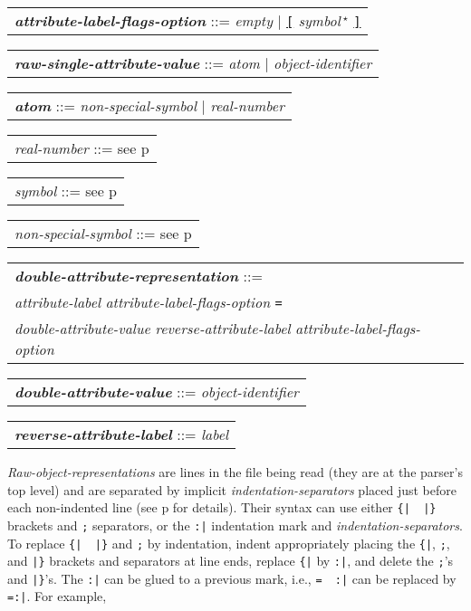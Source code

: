 \documentclass[12pt]{article}
\makeatletter
\newcommand{\emkey}[1]{{\bf \em #1}\index{#1@{\em #1}}}
\newcommand{\pagref}[1]{p\pageref{#1}}
\newenvironment{indpar}[1][0.3in]%
	{\begin{list}{}%
		     {\setlength{\itemsep}{0in}%
		      \setlength{\topsep}{0in}%
		      \setlength{\parsep}{1ex}%
		      \setlength{\labelwidth}{#1}%
		      \setlength{\leftmargin}{#1}%
		      \addtolength{\leftmargin}{\labelsep}}%
	 \item}%
	{\end{list}}
\makeatother
\begin{document}
\begin{indpar}[0.5em]
\begin{tabular}{l}
\emkey{attribute-label-flags-option} ::=
    {\em empty} $|$
    \underline{\tt [} {\em symbol}\,$^\star$ \underline{\tt ]}
\end{tabular}%
%

\begin{tabular}{l}
\emkey{raw-single-attribute-value} ::= {\em atom} $|$ {\em object-identifier}
\end{tabular}

\begin{tabular}{l}
\emkey{atom} ::= {\em non-special-symbol} $|$ {\em real-number}
\end{tabular}

\begin{tabular}{l}
{\em real-number} ::= see \pagref{NUMBER}
\end{tabular}

\begin{tabular}{l}
{\em symbol} ::= see \pagref{SYMBOL}
\end{tabular}

\begin{tabular}{l}
{\em non-special-symbol} ::= see \pagref{SPECIAL-SYMBOL}
\end{tabular}

\begin{tabular}{l}
\emkey{double-attribute-representation} ::=
\\\hspace*{0.5in}
	{\em attribute-label} {\em attribute-label-flags-option}
	\verb|=|
\\\hspace*{0.5in}
	{\em double-attribute-value} {\em reverse-attribute-label}
	{\em attribute-label-flags-option}
\end{tabular}

\begin{tabular}{l}
\emkey{double-attribute-value} ::= {\em object-identifier}
\end{tabular}

\begin{tabular}{l}
\emkey{reverse-attribute-label} ::= {\em label}
\end{tabular}

\end{indpar}

{\em Raw-object-representations} are lines in the file being read
(they are at the parser's top level)
and are separated by implicit {\em indentation-separators} placed
just before each non-indented line (see \pagref{TOP-LEVEL} for details).
Their syntax can
use either \verb/{|  |}/ brackets and \verb|;| separators, or
the \verb/:|/ indentation mark and {\em indentation-separators}.
To replace \verb/{|  |}/ and \verb|;| by indentation,
indent appropriately placing the \verb/{|/, \verb|;|, and \verb/|}/
brackets and separators at line ends, replace \verb/{|/ by \verb/:|/,
and delete the \verb|;|'s and \verb/|}/'s.
The \verb/:|/ can be glued to a previous mark, i.e.,
\verb/=  :|/ can be replaced by \verb/=:|/.  For example,
\end{document}
